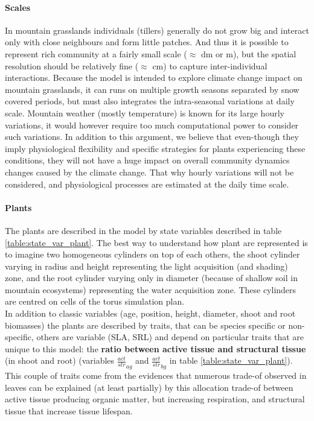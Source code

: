 \documentclass[a4paper,twoside, justified,marginals=raggedright, nobib]{tufte-handout}
\begin{document}
\paragraph{Scales}
In mountain grasslands individuals (tillers) generally do not grow big and interact only with close neighbours and form little patches. And thus it is possible to represent rich community at a fairly small scale ($\approx$ dm or m), but the spatial resolution should be relatively fine ($\approx$ cm) to capture inter-individual interactions. Because the model is intended to explore climate change impact on mountain grasslands, it can runs on multiple growth seasons separated by snow covered periods, but must also integrates the intra-seasonal variations at daily scale. Mountain weather (mostly temperature) is known for its large hourly variations, it would however require too much computational power to consider such variations. In addition  to this argument, we believe that even-though  they imply physiological flexibility and specific strategies for plants experiencing these conditions, they will not have a huge impact on overall community dynamics changes caused by the climate change. That why hourly variations will not be considered, and physiological processes are estimated at the daily time scale.

\paragraph{Plants} The plants are described in the model by state variables described in table \ref{table:state_var_plant}. The best way to understand how plant are represented is to imagine two homogeneous cylinders on top of each others, the shoot cylinder varying in radius and height representing the light acquisition (and shading) zone, and the root cylinder varying only in diameter (because of shallow soil in mountain ecosystems) representing the water acquisition zone. These cylinders are centred on cells of the torus simulation plan.\\
\indent In addition to classic variables (age, position, height, diameter, shoot and root biomasses) the plants are described by traits, that can be species specific or non-specific, others are variable (SLA, SRL) and depend on particular traits that are unique to this model: the \textbf{ratio between active tissue and structural tissue} (in shoot and root) (variables $\frac{act}{str}_{ag}$ and $\frac{act}{str}_{bg}$ in table \ref{table:state_var_plant}). This couple of traits come from the evidences that numerous trade-of observed in leaves can be explained (at least partially) by this allocation trade-of between active tissue producing organic matter, but increasing respiration, and structural tissue that increase tissue lifespan.
\end{document}
